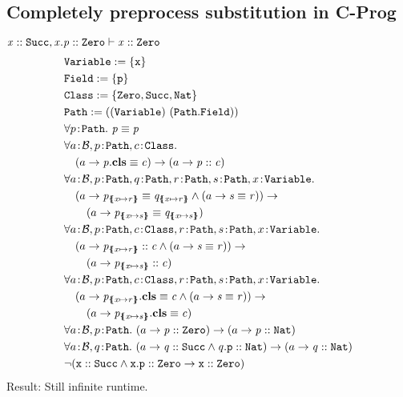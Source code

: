 \documentclass[a4paper]{article}
\begin{document}
\subsection{Completely preprocess substitution in C-Prog}
$\mathit{x} :: \mathit{\mathtt{Succ}}, \mathit{x.p} :: \mathit{\mathtt{Zero}} \vdash \mathit{x} :: \mathit{\mathtt{Zero}}$
\begin{align}
  &\texttt{\Variable} := \{\mathtt{x}\}\\
  &\texttt{\Field} := \{\mathtt{p}\}\\
  &\texttt{\Class} := \{\Zero,\Succ,\Nat\}\\
  &\Path := ((\Variable)~(\Path.\Field))\\
  &\forall \sortedVar{p}{\Path}.~\pathEq{p}{p}\\
  &\forall \sortedVar{a}{\TBool}, \sortedVar{p}{\Path}, \sortedVar{c}{\Class}.\\
  &\quad(a \rightarrow \instBy{p}{c}) \rightarrow (a \rightarrow \instOf{p}{c})\\
  &\forall \sortedVar{a}{\TBool}, \sortedVar{p}{\Path}, \sortedVar{q}{\Path}, \sortedVar{r}{\Path}, \sortedVar{s}{\Path}, \sortedVar{x}{\Variable}.\\
  &\quad (a \rightarrow \pathEq{p_{\sub{x}{r}}}{q_{\sub{x}{r}}} \land (a \rightarrow \pathEq{s}{r})) \rightarrow\\
  &\qquad (a \rightarrow \pathEq{p_{\sub{x}{s}}}{q_{\sub{x}{s}}})\\
  &\forall \sortedVar{a}{\TBool}, \sortedVar{p}{\Path}, \sortedVar{c}{\Class}, \sortedVar{r}{\Path}, \sortedVar{s}{\Path}, \sortedVar{x}{\Variable}.\\
  &\quad (a \rightarrow \instOf{p_{\sub{x}{r}}}{c} \land (a \rightarrow \pathEq{s}{r})) \rightarrow\\
  &\qquad (a \rightarrow \instOf{p_{\sub{x}{s}}}{c})\\
  &\forall \sortedVar{a}{\TBool}, \sortedVar{p}{\Path}, \sortedVar{c}{\Class}, \sortedVar{r}{\Path}, \sortedVar{s}{\Path}, \sortedVar{x}{\Variable}.\\
  &\quad (a \rightarrow \instBy{p_{\sub{x}{r}}}{c} \land (a \rightarrow \pathEq{s}{r})) \rightarrow\\
  &\qquad (a \rightarrow \instBy{p_{\sub{x}{s}}}{c})\\
  &\forall \sortedVar{a}{\TBool}, \sortedVar{p}{\Path}.~(a \rightarrow \instOf{p}{\Zero}) \rightarrow (a \rightarrow \instOf{p}{\Nat})\\
  &\forall \sortedVar{a}{\TBool}, \sortedVar{q}{\Path}.~(a \rightarrow \instOf{q}{\Succ} \land \instOf{q\mathtt{.p}}{\Nat}) \rightarrow (a \rightarrow \instOf{q}{\Nat})\\
  & \neg (\instOf{\mathtt{x}}{\Succ} \land \instOf{\mathtt{x.p}}{\Zero} \rightarrow \instOf{\mathtt{x}}{\Zero})
\end{align}
Result: Still infinite runtime.
\end{document}
